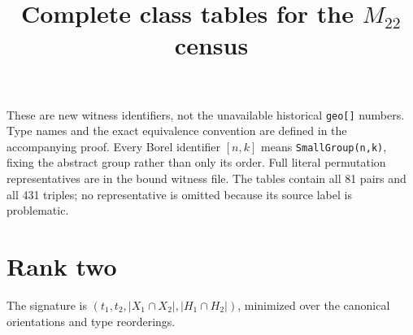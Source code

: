 \documentclass[11pt,a4paper]{article}
\title{Complete class tables for the $M_{22}$ census}\author{}\date{}
\begin{document}
\maketitle
These are new witness identifiers, not the unavailable historical \texttt{geo[]} numbers. Type names and the exact equivalence convention are defined in the accompanying proof. Every Borel identifier $[n,k]$ means \texttt{SmallGroup(n,k)}, fixing the abstract group rather than only its order. Full literal permutation representatives are in the bound witness file. The tables contain all 81 pairs and all 431 triples; no representative is omitted because its source label is problematic.
\section*{Rank two}
The signature is $(t_1,t_2,|X_1\cap X_2|,|H_1\cap H_2|)$, minimized over the canonical orientations and type reorderings.\small
\end{document}
